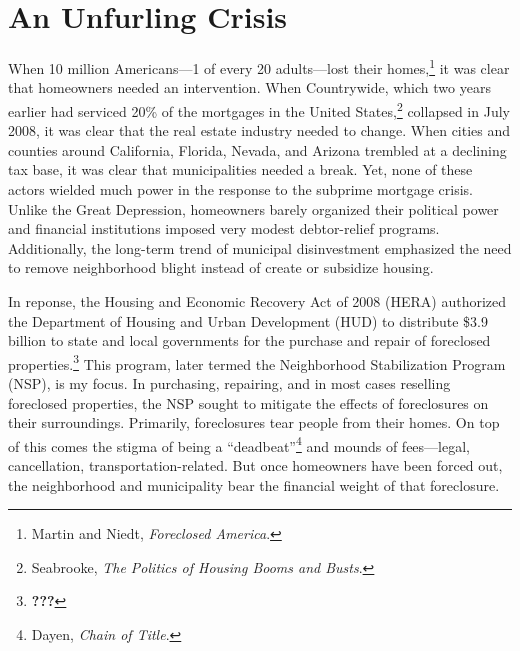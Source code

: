 \documentclass[
]{article}
\date{}
\let\rmarkdownfootnote\footnote%
\def\footnote{\protect\rmarkdownfootnote}
\begin{document}
\hypertarget{actors-motive}{%
\section{An Unfurling Crisis}\label{actors-motive}}

When 10 million Americans---1 of every 20 adults---lost their
homes,\footnote{Martin and Niedt, \emph{Foreclosed America}.} it was
clear that homeowners needed an intervention. When Countrywide, which
two years earlier had serviced 20\% of the mortgages in the United
States,\footnote{Seabrooke, \emph{The Politics of Housing Booms and
  Busts}.} collapsed in July 2008, it was clear that the real estate
industry needed to change. When cities and counties around California,
Florida, Nevada, and Arizona trembled at a declining tax base, it was
clear that municipalities needed a break. Yet, none of these actors
wielded much power in the response to the subprime mortgage crisis.
Unlike the Great Depression, homeowners barely organized their political
power and financial institutions imposed very modest debtor-relief
programs. Additionally, the long-term trend of municipal disinvestment
emphasized the need to remove neighborhood blight instead of create or
subsidize housing.

In reponse, the Housing and Economic Recovery Act of 2008 (HERA)
authorized the Department of Housing and Urban Development (HUD) to
distribute \$3.9 billion to state and local governments for the purchase
and repair of foreclosed properties.\footnote{{\textbf{???}}} This
program, later termed the Neighborhood Stabilization Program (NSP), is
my focus. In purchasing, repairing, and in most cases reselling
foreclosed properties, the NSP sought to mitigate the effects of
foreclosures on their surroundings. Primarily, foreclosures tear people
from their homes. On top of this comes the stigma of being a
``deadbeat''\footnote{Dayen, \emph{Chain of Title}.} and mounds of
fees---legal, cancellation, transportation-related. But once homeowners
have been forced out, the neighborhood and municipality bear the
financial weight of that foreclosure.
\end{document}

